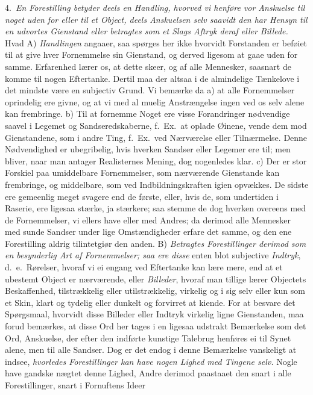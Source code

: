 \documentclass[12pt,a4paper]{article}
\newcommand{\opage}[1]{\marginnote{\footnotesize\textit{[#1]}}}
\begin{document}
4.~\emph{En Forestilling betyder deels en Handling, hvorved vi henføre vor
Anskuelse til noget uden for eller til et Object, deels Anskuelsen selv saavidt den
har Hensyn til en udvortes Gienstand eller betragtes som et Slags Aftryk deraf
eller Billede.}
\opage{40} Hvad A) \emph{Handlingen} angaaer, saa spørges her ikke hvorvidt Forstanden er
beføiet til at give hver Fornemmelse sin Gienstand, og derved ligesom at gaae uden
for samme. Erfarenhed lærer os, at dette skeer, og af alle Mennesker, saasnart de
komme til nogen Eftertanke. Dertil maa der altsaa i de almindelige Tænkelove i det
mindste være en subjectiv Grund. Vi bemærke da a) at alle Fornemmelser oprindelig
ere givne, og at vi med al muelig Anstrængelse ingen ved os selv alene kan
frembringe. b) Til at fornemme Noget ere visse Forandringer nødvendige saavel i
Legemet og Sandseredskaberne, f.~Ex.\ at oplade Øinene, vende dem mod Gienstandene,
som i andre Ting, f.~Ex.\ ved Nærværelse eller Tilnærmelse. Denne Nødvendighed er
ubegribelig, hvis hverken Sandser eller Legemer ere til; men bliver, naar man
antager Realisternes Mening, dog nogenledes klar. c) Der er stor Forskiel paa
umiddelbare Fornemmelser, som nærværende Gienstande kan frembringe, og middelbare,
som ved Indbildningskraften igien opvækkes. De sidste ere gemeenlig meget svagere
end de første, eller, hvis de, som undertiden i Raserie, ere ligesaa stærke, ja
stærkere; saa stemme de dog hverken overeens med de Fornemmelser, vi ellers have
eller med Andres; da derimod alle Mennesker med sunde Sandser under lige
Omstændigheder erfare det samme, og den ene Forestilling aldrig tilintetgiør den
anden.
\opage{41} B) \emph{Betragtes Forestillinger derimod som en besynderlig Art af Fornemmelser;
saa ere disse} enten blot subjective \emph{Indtryk}, d.~e.\ Rørelser, hvoraf vi ei
engang ved Eftertanke kan lære mere, end at et ubestemt Object er nærværende, eller
\emph{Billeder}, hvoraf man tillige lærer Objectets Beskaffenhed, tilstrækkelig
eller utilstrækkelig, virkelig og i sig selv eller kun som et Skin, klart og tydelig
eller dunkelt og forvirret at kiende. For at besvare det Spørgsmaal, hvorvidt disse
Billeder eller Indtryk virkelig ligne Gienstanden, maa forud bemærkes, at disse Ord
her tages i en ligesaa udstrakt Bemærkelse som det Ord, Anskuelse, der efter den
indførte kunstige Talebrug henføres ei til Synet alene, men til alle Sandser. Dog er
det endog i denne Bemærkelse vanskeligt at indsee, \emph{hvorledes Forestillinger
kan have nogen Lighed med Tingene selv.} Nogle have gandske nægtet denne Lighed,
Andre derimod paastaaet den snart i alle Forestillinger, snart i Fornuftens Ideer
\end{document}
